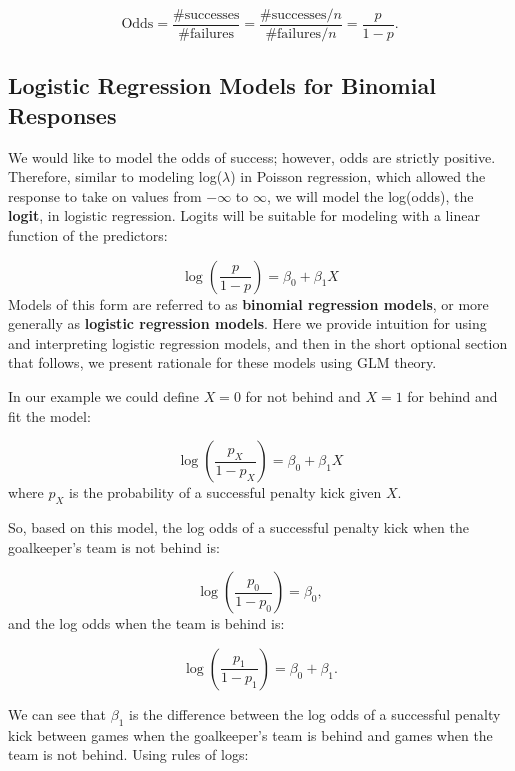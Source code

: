 \documentclass[
]{krantz}
\begin{document}
\[\textrm{Odds} = \frac{\# \textrm{successes}}{\# \textrm{failures}}=
\frac{\# \textrm{successes}/n}{\# \textrm{failures}/n}=
\frac{p}{1-p}.\]

\subsection{Logistic Regression Models for Binomial Responses}\label{logistic-regression-models-for-binomial-responses}

We would like to model the odds of success; however, odds are strictly positive. Therefore, similar to modeling log(\(\lambda\)) in Poisson regression, which allowed the response to take on values from \(-\infty\) to \(\infty\), we will model the log(odds), the \textbf{logit},  in logistic regression. Logits will be suitable for modeling with a linear function of the predictors:

\begin{equation*}
\log\left(\frac{p}{1 - p}\right)=\beta_0+\beta_1X 
 \end{equation*}
Models of this form are referred to as \textbf{binomial regression models},  or more generally as \textbf{logistic regression models}.  Here we provide intuition for using and interpreting logistic regression models, and then in the short optional section that follows, we present rationale for these models using GLM theory.

In our example we could define \(X=0\) for not behind and \(X=1\) for behind and fit the model:

\begin{equation}
\log\left(\frac{p_X}{1-p_X}\right)=\beta_0 +\beta_1X
\label{eq:logitXform}
\end{equation}
where \(p_X\) is the probability of a successful penalty kick given \(X\).

So, based on this model, the log odds of a successful penalty kick when the goalkeeper's team is not behind is:

\[
\log\left(\frac{p_0}{1-p_0}\right) =\beta_0 \nonumber,
\]
and the log odds when the team is behind is:

\[
\log\left(\frac{p_1}{1-p_1}\right)=\beta_0+\beta_1. \nonumber
\]

We can see that \(\beta_1\) is the difference between the log odds of a successful penalty kick between games when the goalkeeper's team is behind and games when the team is not behind. Using rules of logs:
\end{document}
